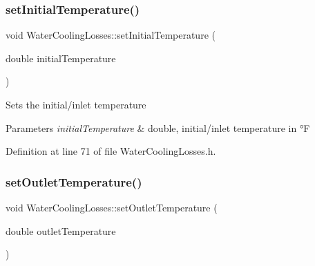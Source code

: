 \mbox{\label{class_water_cooling_losses_a56b0b64b71ecbece780622d5f4b536ba}} 
\subsubsection{\texorpdfstring{set\+Initial\+Temperature()}{setInitialTemperature()}\hspace{0.1cm}{\footnotesize\ttfamily [3/3]}}
{\footnotesize\ttfamily void Water\+Cooling\+Losses\+::set\+Initial\+Temperature (\begin{DoxyParamCaption}\item[{double}]{initial\+Temperature }\end{DoxyParamCaption})\hspace{0.3cm}{\ttfamily [inline]}}

Sets the initial/inlet temperature 
\begin{DoxyParams}{Parameters}
{\em initial\+Temperature} & double, initial/inlet temperature in °F \\
\hline
\end{DoxyParams}


Definition at line 71 of file Water\+Cooling\+Losses.\+h.

\mbox{\label{class_water_cooling_losses_a36bb100df0580a78f63f266cdc1d41f5}} 
\subsubsection{\texorpdfstring{set\+Outlet\+Temperature()}{setOutletTemperature()}\hspace{0.1cm}{\footnotesize\ttfamily [1/3]}}
{\footnotesize\ttfamily void Water\+Cooling\+Losses\+::set\+Outlet\+Temperature (\begin{DoxyParamCaption}\item[{double}]{outlet\+Temperature }\end{DoxyParamCaption})\hspace{0.3cm}{\ttfamily [inline]}}


